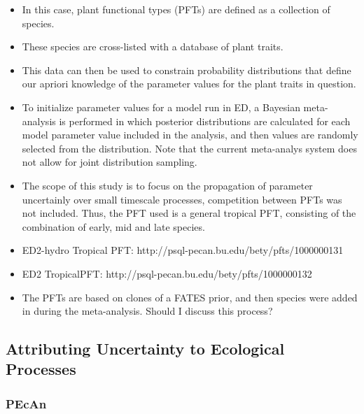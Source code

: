 \begin{itemize}
    \item In this case, plant functional types (PFTs) are defined as a collection of species. 
    \item These species are cross-listed with a database of plant traits. 
    \item This data can then be used to constrain probability distributions that define our apriori knowledge of the parameter values for the plant traits in question. 
    \item To initialize parameter values for a model run in ED, a Bayesian meta-analysis is performed in which posterior distributions are calculated for each model parameter value included in the analysis, and then values are randomly selected from the distribution. Note that the current meta-analys system does not allow for joint distribution sampling. 
    \item The scope of this study is to focus on the propagation of parameter uncertainly over small timescale processes, competition between PFTs was not included. Thus, the PFT used is a general tropical PFT, consisting of the combination of early, mid and late species.
\end{itemize}

\begin{itemize}
    \item ED2-hydro Tropical PFT: http://psql-pecan.bu.edu/bety/pfts/1000000131
    \item ED2 TropicalPFT: http://psql-pecan.bu.edu/bety/pfts/1000000132
    \item The PFTs are based on clones of a FATES prior, and then species were added in during the meta-analysis. Should I discuss this process?
\end{itemize}

\newpage
{}
\subsection*{Attributing Uncertainty to Ecological Processes}

{}
\subsubsection*{PEcAn}

